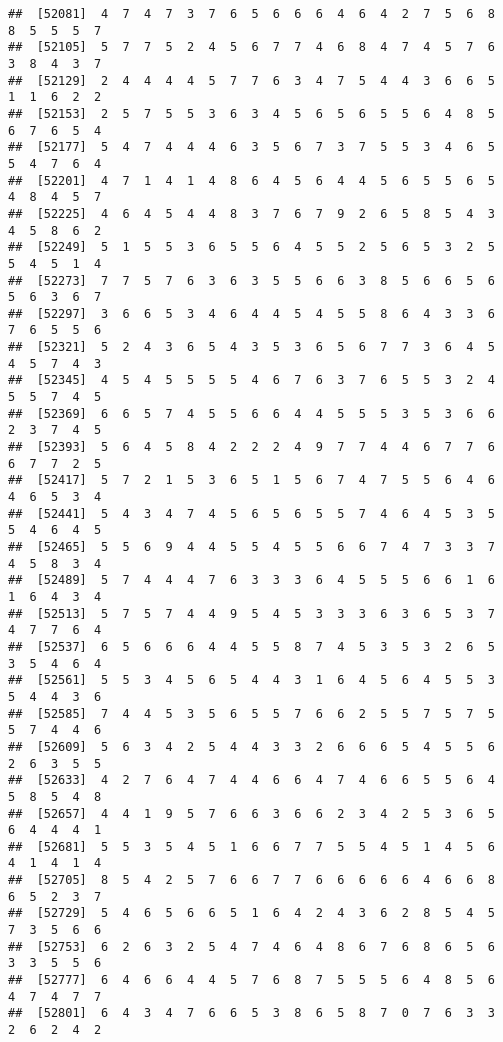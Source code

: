 \documentclass[
]{book}
\begin{document}
\begin{verbatim}
##  [52081]  4  7  4  7  3  7  6  5  6  6  6  4  6  4  2  7  5  6  8  8  5  5  5  7
##  [52105]  5  7  7  5  2  4  5  6  7  7  4  6  8  4  7  4  5  7  6  3  8  4  3  7
##  [52129]  2  4  4  4  4  5  7  7  6  3  4  7  5  4  4  3  6  6  5  1  1  6  2  2
##  [52153]  2  5  7  5  5  3  6  3  4  5  6  5  6  5  5  6  4  8  5  6  7  6  5  4
##  [52177]  5  4  7  4  4  4  6  3  5  6  7  3  7  5  5  3  4  6  5  5  4  7  6  4
##  [52201]  4  7  1  4  1  4  8  6  4  5  6  4  4  5  6  5  5  6  5  4  8  4  5  7
##  [52225]  4  6  4  5  4  4  8  3  7  6  7  9  2  6  5  8  5  4  3  4  5  8  6  2
##  [52249]  5  1  5  5  3  6  5  5  6  4  5  5  2  5  6  5  3  2  5  5  4  5  1  4
##  [52273]  7  7  5  7  6  3  6  3  5  5  6  6  3  8  5  6  6  5  6  5  6  3  6  7
##  [52297]  3  6  6  5  3  4  6  4  4  5  4  5  5  8  6  4  3  3  6  7  6  5  5  6
##  [52321]  5  2  4  3  6  5  4  3  5  3  6  5  6  7  7  3  6  4  5  4  5  7  4  3
##  [52345]  4  5  4  5  5  5  5  4  6  7  6  3  7  6  5  5  3  2  4  5  5  7  4  5
##  [52369]  6  6  5  7  4  5  5  6  6  4  4  5  5  5  3  5  3  6  6  2  3  7  4  5
##  [52393]  5  6  4  5  8  4  2  2  2  4  9  7  7  4  4  6  7  7  6  6  7  7  2  5
##  [52417]  5  7  2  1  5  3  6  5  1  5  6  7  4  7  5  5  6  4  6  4  6  5  3  4
##  [52441]  5  4  3  4  7  4  5  6  5  6  5  5  7  4  6  4  5  3  5  5  4  6  4  5
##  [52465]  5  5  6  9  4  4  5  5  4  5  5  6  6  7  4  7  3  3  7  4  5  8  3  4
##  [52489]  5  7  4  4  4  7  6  3  3  3  6  4  5  5  5  6  6  1  6  1  6  4  3  4
##  [52513]  5  7  5  7  4  4  9  5  4  5  3  3  3  6  3  6  5  3  7  4  7  7  6  4
##  [52537]  6  5  6  6  6  4  4  5  5  8  7  4  5  3  5  3  2  6  5  3  5  4  6  4
##  [52561]  5  5  3  4  5  6  5  4  4  3  1  6  4  5  6  4  5  5  3  5  4  4  3  6
##  [52585]  7  4  4  5  3  5  6  5  5  7  6  6  2  5  5  7  5  7  5  5  7  4  4  6
##  [52609]  5  6  3  4  2  5  4  4  3  3  2  6  6  6  5  4  5  5  6  2  6  3  5  5
##  [52633]  4  2  7  6  4  7  4  4  6  6  4  7  4  6  6  5  5  6  4  5  8  5  4  8
##  [52657]  4  4  1  9  5  7  6  6  3  6  6  2  3  4  2  5  3  6  5  6  4  4  4  1
##  [52681]  5  5  3  5  4  5  1  6  6  7  7  5  5  4  5  1  4  5  6  4  1  4  1  4
##  [52705]  8  5  4  2  5  7  6  6  7  7  6  6  6  6  6  4  6  6  8  6  5  2  3  7
##  [52729]  5  4  6  5  6  6  5  1  6  4  2  4  3  6  2  8  5  4  5  7  3  5  6  6
##  [52753]  6  2  6  3  2  5  4  7  4  6  4  8  6  7  6  8  6  5  6  3  3  5  5  6
##  [52777]  6  4  6  6  4  4  5  7  6  8  7  5  5  5  6  4  8  5  6  4  7  4  7  7
##  [52801]  6  4  3  4  7  6  6  5  3  8  6  5  8  7  0  7  6  3  3  2  6  2  4  2

\end{verbatim}
\end{document}
